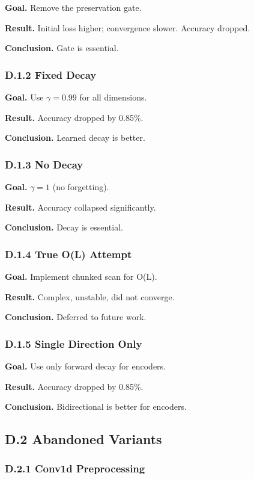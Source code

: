 \textbf{Goal.} Remove the preservation gate.

\textbf{Result.} Initial loss higher; convergence slower. Accuracy dropped.

\textbf{Conclusion.} Gate is essential.

\subsubsection{D.1.2 Fixed Decay}

\textbf{Goal.} Use $\gamma = 0.99$ for all dimensions.

\textbf{Result.} Accuracy dropped by 0.85\%.

\textbf{Conclusion.} Learned decay is better.

\subsubsection{D.1.3 No Decay}

\textbf{Goal.} $\gamma = 1$ (no forgetting).

\textbf{Result.} Accuracy collapsed significantly.

\textbf{Conclusion.} Decay is essential.

\subsubsection{D.1.4 True O(L) Attempt}

\textbf{Goal.} Implement chunked scan for O(L).

\textbf{Result.} Complex, unstable, did not converge.

\textbf{Conclusion.} Deferred to future work.

\subsubsection{D.1.5 Single Direction Only}

\textbf{Goal.} Use only forward decay for encoders.

\textbf{Result.} Accuracy dropped by 0.85\%.

\textbf{Conclusion.} Bidirectional is better for encoders.

\subsection{D.2 Abandoned Variants}

\subsubsection{D.2.1 Conv1d Preprocessing}

